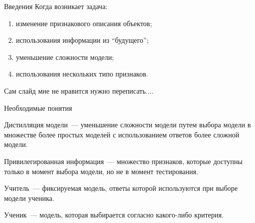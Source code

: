\documentclass[9pt,pdf,hyperref={unicode}]{beamer}
\begin{document}
\begin{frame}{Введения}
\justifying
Когда возникает задача:
\begin{enumerate}
	\item изменение признакового описания объектов;
	\item использования информации из ``будущего'';
	\item уменьшение сложности модели;
	\item использования нескольких типо признаков.
\end{enumerate}

{\color{red} Сам слайд мне не нравится нужно переписать....}
\end{frame}
\begin{frame}{Необходимые понятия}
\justifying
\begin{definition}
\justifying
Дистилляция модели~--- уменьшение сложности модели путем выбора модели в множестве более простых моделей с использованием ответов более сложной модели.
\end{definition}

\begin{definition}
\justifying
Привилегированная информация~--- множество признаков, которые доступны только в момент выбора модели, но не в момент тестирования.
\end{definition}

\begin{definition}
\justifying
Учитель~--- фиксируемая модель, ответы которой используются при выборе модели ученика.
\end{definition}

\begin{definition}
\justifying
Ученик~--- модель, которая выбирается согласно какого-либо критерия.
\end{definition}

\end{frame}
\end{document}
